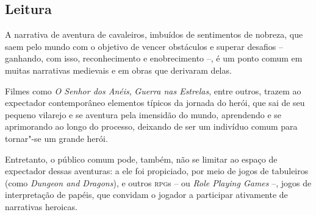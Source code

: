 \documentclass[11pt]{extarticle}
\begin{document}
\subsection{Leitura}



A narrativa de aventura de cavaleiros, imbuídos de
sentimentos de nobreza, que saem pelo mundo com o objetivo de vencer
obstáculos e superar desafios -- ganhando, com isso, reconhecimento e
enobrecimento --, é um ponto comum em muitas narrativas medievais e em
obras que derivaram delas.

Filmes como \emph{O Senhor dos Anéis}, \emph{Guerra nas Estrelas}, entre
outros, trazem ao expectador contemporâneo elementos típicos da jornada
do herói, que sai de seu pequeno vilarejo e se aventura pela imensidão
do mundo, aprendendo e se aprimorando ao longo do processo, deixando de
ser um indivíduo comum para tornar"-se um grande herói.

Entretanto, o público comum pode, também, não se limitar ao espaço de
expectador dessas aventuras: a ele foi propiciado, por meio de jogos de
tabuleiros (como \emph{Dungeon and Dragons}), e outros \textsc{rpg}s -- ou
\emph{Role Playing Games} --, jogos de interpretação de papéis, que
convidam o jogador a participar ativamente de narrativas heroicas.
\end{document}
